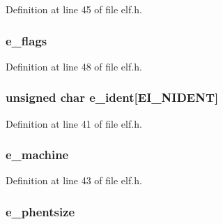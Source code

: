 Definition at line 45 of file elf.\-h.

\hypertarget{struct_elf32___ehdr_af4e9f6a9950c02e6378aa0e85aa8bfe3}{
\subsubsection[{e\-\_\-flags}]{ e\-\_\-flags}}\label{struct_elf32___ehdr_af4e9f6a9950c02e6378aa0e85aa8bfe3}


Definition at line 48 of file elf.\-h.

\hypertarget{struct_elf32___ehdr_a989deb32d9be1514da87d64e8698600a}{
\subsubsection[{e\-\_\-ident}]{\setlength{\rightskip}{0pt plus 5cm}unsigned char e\-\_\-ident\mbox{[}{\bf E\-I\-\_\-\-N\-I\-D\-E\-N\-T}\mbox{]}}}\label{struct_elf32___ehdr_a989deb32d9be1514da87d64e8698600a}


Definition at line 41 of file elf.\-h.

\hypertarget{struct_elf32___ehdr_a334b2b2406970a5d2a0a903dd5ed5745}{
\subsubsection[{e\-\_\-machine}]{ e\-\_\-machine}}\label{struct_elf32___ehdr_a334b2b2406970a5d2a0a903dd5ed5745}


Definition at line 43 of file elf.\-h.

\hypertarget{struct_elf32___ehdr_ad0b31b8c5e1c550d79195f8190650caa}{
\subsubsection[{e\-\_\-phentsize}]{ e\-\_\-phentsize}}\label{struct_elf32___ehdr_ad0b31b8c5e1c550d79195f8190650caa}


